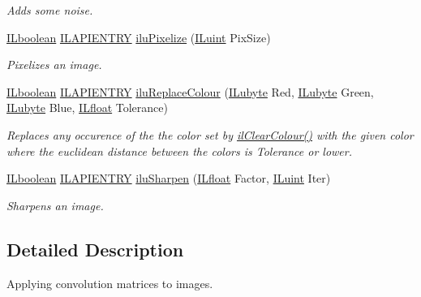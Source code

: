 \begin{DoxyCompactItemize}
\begin{DoxyCompactList}\small\item\em Adds some noise. \end{DoxyCompactList}\item 
\hyperlink{group__il__types_gaa6aa7c95cfdc06b4d8601ef832b7bb0a}{I\+Lboolean} \hyperlink{_i_l_8h_a69c08a8d06df986f7e46f209d131ef2f}{I\+L\+A\+P\+I\+E\+N\+T\+R\+Y} \hyperlink{group__ilu__filter_ga609a51f490472174047feaf70918e3ac}{ilu\+Pixelize} (\hyperlink{group__il__types_gaff8e86a1072c8d7cfe387fb87c6ed8e1}{I\+Luint} Pix\+Size)
\begin{DoxyCompactList}\small\item\em Pixelizes an image. \end{DoxyCompactList}\item 
\hyperlink{group__il__types_gaa6aa7c95cfdc06b4d8601ef832b7bb0a}{I\+Lboolean} \hyperlink{_i_l_8h_a69c08a8d06df986f7e46f209d131ef2f}{I\+L\+A\+P\+I\+E\+N\+T\+R\+Y} \hyperlink{group__ilu__filter_gac3447a57b322058f1c2e49faa724e4f0}{ilu\+Replace\+Colour} (\hyperlink{group__il__types_ga057357939bc5a12e8061715453568519}{I\+Lubyte} Red, \hyperlink{group__il__types_ga057357939bc5a12e8061715453568519}{I\+Lubyte} Green, \hyperlink{group__il__types_ga057357939bc5a12e8061715453568519}{I\+Lubyte} Blue, \hyperlink{group__il__types_ga376156c9461893f4b1a5de9579dc86f2}{I\+Lfloat} Tolerance)
\begin{DoxyCompactList}\small\item\em Replaces any occurence of the the color set by \hyperlink{group__state_gaca1dc7f7b8e61eb134060c9c8a8b72f2}{il\+Clear\+Colour()} with the given color where the euclidean distance between the colors is {\itshape Tolerance} or lower. \end{DoxyCompactList}\item 
\hyperlink{group__il__types_gaa6aa7c95cfdc06b4d8601ef832b7bb0a}{I\+Lboolean} \hyperlink{_i_l_8h_a69c08a8d06df986f7e46f209d131ef2f}{I\+L\+A\+P\+I\+E\+N\+T\+R\+Y} \hyperlink{group__ilu__filter_gab8e36ca96f5766b4c9fd6727d688405a}{ilu\+Sharpen} (\hyperlink{group__il__types_ga376156c9461893f4b1a5de9579dc86f2}{I\+Lfloat} Factor, \hyperlink{group__il__types_gaff8e86a1072c8d7cfe387fb87c6ed8e1}{I\+Luint} Iter)
\begin{DoxyCompactList}\small\item\em Sharpens an image. \end{DoxyCompactList}\end{DoxyCompactItemize}


\subsection{Detailed Description}
Applying convolution matrices to images. 

